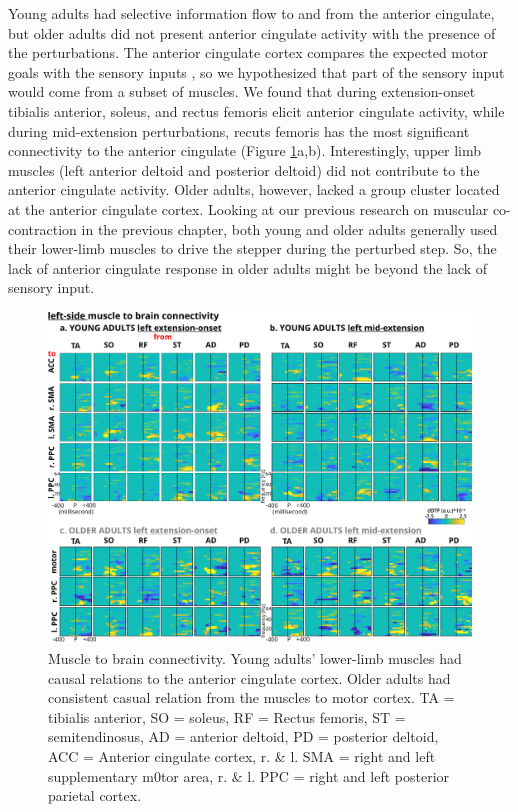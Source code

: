 \documentclass[../thesis_seyed.tex]{subfiles}
\begin{document}
Young adults had selective information flow to and from the anterior cingulate, but older adults did not present anterior cingulate activity with the presence of the perturbations. The anterior cingulate cortex compares the expected motor goals with the sensory inputs \cite{Holroyd2002-fl,Shenhav2013-qj}, so we hypothesized that part of the sensory input would come from a subset of muscles. We found that during extension-onset tibialis anterior, soleus, and rectus femoris elicit anterior cingulate activity, while during mid-extension perturbations, recuts femoris has the most significant connectivity to the anterior cingulate (Figure \ref{fig:m2b}a,b). Interestingly, upper limb muscles (left anterior deltoid and posterior deltoid) did not contribute to the anterior cingulate activity. Older adults, however, lacked a group cluster located at the anterior cingulate cortex. Looking at our previous research on muscular co-contraction in the previous chapter, both young and older adults generally used their lower-limb muscles to drive the stepper during the perturbed step. So, the lack of anterior cingulate response in older adults might be beyond the lack of sensory input.

\begin{figure}[!h]

    \centering
    \includegraphics[width=\linewidth]{../img/figure 6 - M2B connectivity.jpg}
    \caption{Muscle to brain connectivity. Young adults’ lower-limb muscles had causal relations to the anterior cingulate cortex. Older adults had consistent casual relation from the muscles to motor cortex. TA = tibialis anterior, SO = soleus, RF = Rectus femoris, ST = semitendinosus, AD = anterior deltoid, PD = posterior deltoid, ACC = Anterior cingulate cortex, r. \& l. SMA = right and left supplementary m0tor area, r. \& l. PPC = right and left posterior parietal cortex.}
    \label{fig:m2b}
\end{figure}
\end{document}
